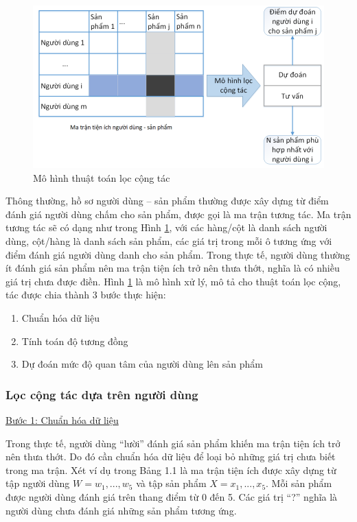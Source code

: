 \begin{figure}[htbp]
    \centering
    \includegraphics[width=1\textwidth]{imgs/chapter_2/loc-cong-tac.png}
    \caption{Mô hình thuật toán lọc cộng tác}
    \label{lct}
\end{figure}
Thông thường, hồ sơ người dùng – sản phẩm thường được xây dựng từ điểm đánh giá người dùng chấm
cho sản phẩm, được gọi là ma trận tương tác. Ma trận tương tác sẽ có dạng như trong Hình \ref{lct}, với các hàng/cột là danh sách người dùng, cột/hàng là danh sách sản phẩm, các giá
trị trong mỗi ô tương ứng với điểm đánh giá người dùng danh cho sản phẩm. Trong thực
tế, người dùng thường ít đánh giá sản phẩm nên ma trận tiện ích trở nên thưa thớt, nghĩa
là có nhiều giá trị chưa được điền. Hình \ref{lct} là mô hình xử lý, mô tả cho thuật toán lọc
cộng, tác được chia thành 3 bước thực hiện:
\begin{enumerate}
    \item Chuẩn hóa dữ liệu
    \item Tính toán độ tương đồng
    \item Dự đoán mức độ quan tâm của người dùng lên sản phẩm
\end{enumerate}

\subsubsection{Lọc cộng tác dựa trên người dùng}

\underline{Bước 1: Chuẩn hóa dữ liệu}

    Trong thực tế, người dùng “lười” đánh giá sản phẩm khiến ma trận tiện ích trở nên
thưa thớt. Do đó cần chuẩn hóa dữ liệu để loại bỏ những giá trị chưa biết trong ma trận.
Xét ví dụ trong Bảng 1.1 là ma trận tiện ích được xây dựng từ tập người dùng $W = {w_1, ..., w_5}$ và tập sản phẩm $X={x_1, ..., x_5}$. Mỗi sản phẩm được người dùng đánh giá trên thang điểm từ 0 đến 5. Các giá trị “?” nghĩa là người dùng chưa đánh giá những sản phẩm tương ứng.

